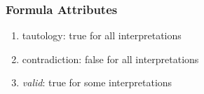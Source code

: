 \documentclass[dvipsnames]{beamer}
\begin{document}
%
%
%
%
%

\begin{frame}
  \frametitle{Formula Attributes}

  \begin{enumerate}
    \item \alert{tautology}: true for all interpretations
    \item \alert{contradiction}: false for all interpretations
    \item \emph{valid}: true for some interpretations
  \end{enumerate}
\end{frame}
\end{document}
